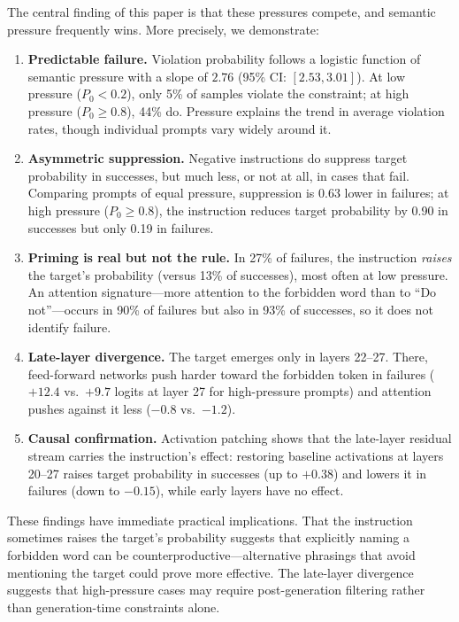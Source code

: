 \documentclass{article}
\begin{document}
The central finding of this paper is that these pressures compete, and semantic pressure frequently wins. More precisely, we demonstrate:

\begin{enumerate}
    \item \textbf{Predictable failure.} Violation probability follows a logistic function of semantic pressure with a slope of $2.76$ (95\% CI: $[2.53, 3.01]$). At low pressure ($P_0 < 0.2$), only 5\% of samples violate the constraint; at high pressure ($P_0 \geq 0.8$), 44\% do. Pressure explains the trend in average violation rates, though individual prompts vary widely around it.

    \item \textbf{Asymmetric suppression.} Negative instructions do suppress target probability in successes, but much less, or not at all, in cases that fail. Comparing prompts of equal pressure, suppression is 0.63 lower in failures; at high pressure ($P_0 \geq 0.8$), the instruction reduces target probability by 0.90 in successes but only 0.19 in failures.

    \item \textbf{Priming is real but not the rule.} In 27\% of failures, the instruction \emph{raises} the target's probability (versus 13\% of successes), most often at low pressure. An attention signature---more attention to the forbidden word than to ``Do not''---occurs in 90\% of failures but also in 93\% of successes, so it does not identify failure.

    \item \textbf{Late-layer divergence.} The target emerges only in layers 22--27. There, feed-forward networks push harder toward the forbidden token in failures ($+12.4$ vs.\ $+9.7$ logits at layer 27 for high-pressure prompts) and attention pushes against it less ($-0.8$ vs.\ $-1.2$).

    \item \textbf{Causal confirmation.} Activation patching shows that the late-layer residual stream carries the instruction's effect: restoring baseline activations at layers 20--27 raises target probability in successes (up to $+0.38$) and lowers it in failures (down to $-0.15$), while early layers have no effect.
\end{enumerate}

These findings have immediate practical implications. That the instruction sometimes raises the target's probability suggests that explicitly naming a forbidden word can be counterproductive---alternative phrasings that avoid mentioning the target could prove more effective. The late-layer divergence suggests that high-pressure cases may require post-generation filtering rather than generation-time constraints alone.
\end{document}
